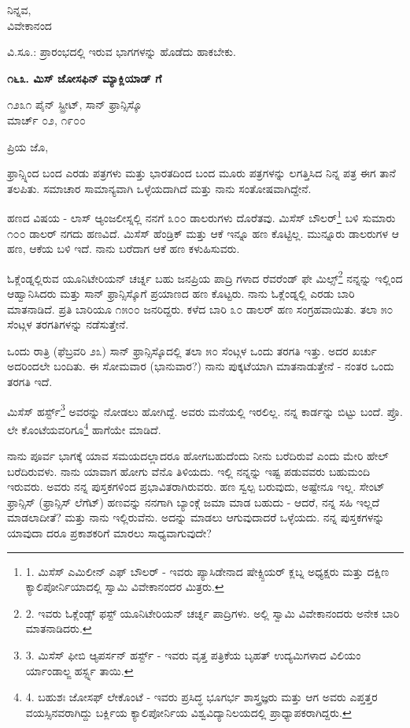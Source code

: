 \begin{flushright}
ನಿನ್ನವ,\\ವಿವೇಕಾನಂದ
\end{flushright}

ವಿ.ಸೂ.: ಪ್ರಾರಂಭದಲ್ಲಿ ಇರುವ ಭಾಗಗಳನ್ನು ಹೊಡೆದು ಹಾಕಬೇಕು.

\begin{center}
\textbf{೧೬೩. ಮಿಸ್ ಜೋಸಫಿನ್ ಮ್ಯಾಕ್ಲಿಯಾಡ್ ಗೆ}
\end{center}

\begin{flushright}
೧೨೩೧ ಪೈನ್ ಸ್ಟ್ರೀಟ್, ಸಾನ್ ಫ್ರಾನ್ಸಿಸ್ಕೊ\\ಮಾರ್ಚ್ ೦೨, ೧೯೦೦
\end{flushright}

ಪ್ರಿಯ ಜೊ,

ಫ್ರಾನ್ಸ್ನಿಂದ ಬಂದ ಎರಡು ಪತ್ರಗಳು ಮತ್ತು ಭಾರತದಿಂದ ಬಂದ ಮೂರು ಪತ್ರಗಳನ್ನು ಲಗತ್ತಿಸಿದ ನಿನ್ನ ಪತ್ರ ಈಗ ತಾನೆ ತಲಪಿತು. ಸಮಾಚಾರ ಸಾಮಾನ್ಯವಾಗಿ ಒಳ್ಳೆಯದಾಗಿದೆ ಮತ್ತು ನಾನು ಸಂತೋಷವಾಗಿದ್ದೇನೆ.

ಹಣದ ವಿಷಯ - ಲಾಸ್ ಆ್ಯಂಜಲೀಸ್ನಲ್ಲಿ ನನಗೆ ೩೦೦ ಡಾಲರುಗಳು ದೊರೆತವು. ಮಿಸೆಸ್ ಬೌಲರ್\footnote{1. ಮಿಸೆಸ್ ಎಮಿಲೀನ್ ಎಫ್ ಬೌಲರ್ - ಇವರು ಪ್ಯಾಸಿಡೇನಾದ ಷೇಕ್ಸ್ಪಿಯರ್ ಕ್ಲಬ್ನ ಅಧ್ಯಕ್ಷರು ಮತ್ತು ದಕ್ಷಿಣ ಕ್ಯಾಲಿಪೋರ್ನಿಯಾದಲ್ಲಿ ಸ್ವಾಮಿ ವಿವೇಕಾನಂದರ ಮಿತ್ರರು.} ಬಳಿ ಸುಮಾರು ೧೦೦ ಡಾಲರ್ ನಗದು ಹಣವಿದೆ. ಮಿಸೆಸ್ ಹೆಂಡ್ರಿಕ್ ಮತ್ತು ಆಕೆ ಇನ್ನೂ ಹಣ ಕೊಟ್ಟಿಲ್ಲ. ಮುನ್ನೂರು ಡಾಲರುಗಳ ಆ ಹಣ, ಆಕೆಯ ಬಳಿ ಇದೆ. ನಾನು ಬರೆದಾಗ ಆಕೆ ಹಣ ಕಳುಹಿಸುವರು.

ಓಕ್ಲೆಂಡ್ನಲ್ಲಿರುವ ಯೂನಿಟೇರಿಯನ್ ಚರ್ಚ್ನ ಬಹು ಜನಪ್ರಿಯ ಪಾದ್ರಿ ಗಳಾದ ರೆವರೆಂಡ್ ಫೇ ಮಿಲ್ಸ್\footnote{2. ಇವರು ಓಕ್ಲೆಂಡ್ಸ್ ಫಸ್ಟ್ ಯೂನಿಟೇರಿಯನ್ ಚರ್ಚ್ನ ಪಾದ್ರಿಗಳು. ಅಲ್ಲಿ ಸ್ವಾಮಿ ವಿವೇಕಾನಂದರು ಅನೇಕ ಬಾರಿ ಮಾತನಾಡಿದರು.} ನನ್ನನ್ನು ಇಲ್ಲಿಂದ ಆಹ್ವಾನಿಸಿದರು ಮತ್ತು ಸಾನ್ ಫ್ರಾನ್ಸಿಸ್ಕೊಗೆ ಪ್ರಯಾಣದ ಹಣ ಕೊಟ್ಟರು. ನಾನು ಓಕ್ಲೆಂಡ್ನಲ್ಲಿ ಎರಡು ಬಾರಿ ಮಾತನಾಡಿದೆ. ಪ್ರತಿ ಬಾರಿಯೂ ೧೫೦೦ ಜನರಿದ್ದರು. ಕಳೆದ ಬಾರಿ ೩೦ ಡಾಲರ್ ಹಣ ಸಂಗ್ರಹವಾಯಿತು. ತಲಾ ೫೦ ಸೆಂಟ್ಗಳ ತರಗತಿಗಳನ್ನು ನಡೆಸುತ್ತೇನೆ.

ಒಂದು ರಾತ್ರಿ (ಫೆಬ್ರವರಿ ೨೩) ಸಾನ್ ಫ್ರಾನ್ಸಿಸ್ಕೊದಲ್ಲಿ ತಲಾ ೫೦ ಸೆಂಟ್ಗಳ ಒಂದು ತರಗತಿ ಇತ್ತು. ಅದರ ಖರ್ಚು ಅದರಿಂದಲೇ ಬಂದಿತು. ಈ ಸೋಮವಾರ (ಭಾನುವಾರ?) ನಾನು ಪುಕ್ಕಟೆಯಾಗಿ ಮಾತನಾಡುತ್ತೇನೆ - ನಂತರ ಒಂದು ತರಗತಿ ಇದೆ.

ಮಿಸೆಸ್ ಹರ್ಸ್ಟ್\footnote{3. ಮಿಸೆಸ್ ಫೀಬಿ ಆ್ಯಪರ್ಸನ್ ಹರ್ಸ್ಟ್ - ಇವರು ವೃತ್ತ ಪತ್ರಿಕೆಯ ಬೃಹತ್ ಉದ್ಯಮಿಗಳಾದ ವಿಲಿಯಂ ರ್ಯಾಂಡಾಲ್ಙ ಹರ್ಸ್ಟ್ನ ತಾಯಿ.} ಅವರನ್ನು ನೋಡಲು ಹೋಗಿದ್ದೆ. ಅವರು ಮನೆಯಲ್ಲಿ ಇರಲಿಲ್ಲ. ನನ್ನ ಕಾರ್ಡನ್ನು ಬಿಟ್ಟು ಬಂದೆ. ಪ್ರೊ. ಲೇ ಕೊಂಟೆಯವರಿಗೂ\footnote{4. ಬಹುಶಃ ಜೋಸಫ್ ಲೇಕೊಂಟೆ - ಇವರು ಪ್ರಸಿದ್ಧ ಭೂಗರ್ಭ ಶಾಸ್ತ್ರಜ್ಞರು ಮತ್ತು ಆಗ ಅವರು ಎಪ್ತತ್ತರ ವಯಸ್ಸಿನವರಾಗಿದ್ದು ಬರ್ಕ್ಲಿಯ ಕ್ಯಾಲಿಪೋರ್ನಿಯ ವಿಶ್ವವಿದ್ಯಾನಿಲಯದಲ್ಲಿ ಪ್ರಾಧ್ಯಾಪಕರಾಗಿದ್ದರು.} ಹಾಗೆಯೇ ಮಾಡಿದೆ.

ನಾನು ಪೂರ್ವ ಭಾಗಕ್ಕೆ ಯಾವ ಸಮಯದಲ್ಲಾದರೂ ಹೋಗಬಹುದೆಂದು ನೀನು ಬರೆದಿರುವೆ ಎಂದು ಮೇರಿ ಹೇಲ್ ಬರೆದಿರುವಳು. ನಾನು ಯಾವಾಗ ಹೋಗು ವೆನೊ ತಿಳಿಯದು. ಇಲ್ಲಿ ನನ್ನನ್ನು ಇಷ್ಟ ಪಡುವವರು ಬಹುಮಂದಿ ಇರುವರು. ಅವರು ನನ್ನ ಪುಸ್ತಕಗಳಿಂದ ಪ್ರಭಾವಿತರಾಗಿರುವರು. ಹಣ ಸ್ವಲ್ಪ ಬರುವುದು, ಅಷ್ಟೇನೂ ಇಲ್ಲ. ಸೇಂಟ್ ಫ್ರಾನ್ಸಿಸ್ (ಫ್ರಾನ್ಸಿಸ್ ಲೆಗೆಟ್) ಹಣವನ್ನು ನನಗಾಗಿ ಬ್ಯಾಂಕ್ಗೆ ಜಮಾ ಮಾಡ ಬಹುದು - ಆದರೆ, ನನ್ನ ಸಹಿ ಇಲ್ಲದೆ ಮಾಡಲಾದೀತೆ? ಮತ್ತು ನಾನು ಇಲ್ಲಿರುವೆನು. ಅದನ್ನು ಮಾಡಲು ಆಗುವುದಾದರೆ ಒಳ್ಳೆಯದು. ನನ್ನ ಪುಸ್ತಕಗಳನ್ನು ಯಾವುದಾ ದರೂ ಪ್ರಕಾಶಕರಿಗೆ ಮಾರಲು ಸಾಧ್ಯವಾಗುವುದೇ?

